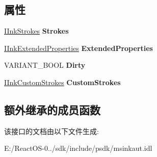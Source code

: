 \subsection*{属性}
\begin{DoxyCompactItemize}
\item 
\mbox{\label{interface_m_s_i_n_k_a_u_t_lib_1_1_i_ink_disp_a11f5dce83aecf5b4d72f520c9f4845fc}} 
\hyperlink{interface_m_s_i_n_k_a_u_t_lib_1_1_i_ink_strokes}{I\+Ink\+Strokes} {\bfseries Strokes}
\item 
\mbox{\label{interface_m_s_i_n_k_a_u_t_lib_1_1_i_ink_disp_a3482c1749d60c7ceb3a871cdde1b4c74}} 
\hyperlink{interface_m_s_i_n_k_a_u_t_lib_1_1_i_ink_extended_properties}{I\+Ink\+Extended\+Properties} {\bfseries Extended\+Properties}
\item 
\mbox{\label{interface_m_s_i_n_k_a_u_t_lib_1_1_i_ink_disp_ab9846db558cd8f66b0d755c9e54a509f}} 
V\+A\+R\+I\+A\+N\+T\+\_\+\+B\+O\+OL {\bfseries Dirty}
\item 
\mbox{\label{interface_m_s_i_n_k_a_u_t_lib_1_1_i_ink_disp_a6658ec74a7bd0ab39d68d943cd5aeec7}} 
\hyperlink{interface_m_s_i_n_k_a_u_t_lib_1_1_i_ink_custom_strokes}{I\+Ink\+Custom\+Strokes} {\bfseries Custom\+Strokes}
\end{DoxyCompactItemize}
\subsection*{额外继承的成员函数}


该接口的文档由以下文件生成\+:\begin{DoxyCompactItemize}
\item 
E\+:/\+React\+O\+S-\/0../sdk/include/psdk/msinkaut.\+idl\end{DoxyCompactItemize}
